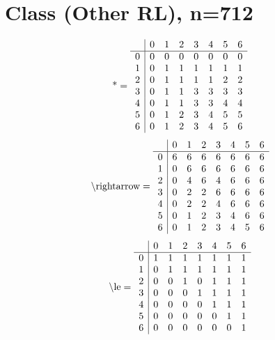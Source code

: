 \documentclass[11pt]{article}
\begin{document}
\section{Class (Other RL), n=712}
\[\text{*} = 
\begin{array}{r | r r r r r r r}
 & 0 & 1 & 2 & 3 & 4 & 5 & 6 \\ \hline
0 & 0 & 0 & 0 & 0 & 0 & 0 & 0 \\
1 & 0 & 1 & 1 & 1 & 1 & 1 & 1 \\
2 & 0 & 1 & 1 & 1 & 1 & 2 & 2 \\
3 & 0 & 1 & 1 & 3 & 3 & 3 & 3 \\
4 & 0 & 1 & 1 & 3 & 3 & 4 & 4 \\
5 & 0 & 1 & 2 & 3 & 4 & 5 & 5 \\
6 & 0 & 1 & 2 & 3 & 4 & 5 & 6 \\
\end{array}
\]
\[\text{\textbackslash rightarrow} = 
\begin{array}{r | r r r r r r r}
 & 0 & 1 & 2 & 3 & 4 & 5 & 6 \\ \hline
0 & 6 & 6 & 6 & 6 & 6 & 6 & 6 \\
1 & 0 & 6 & 6 & 6 & 6 & 6 & 6 \\
2 & 0 & 4 & 6 & 4 & 6 & 6 & 6 \\
3 & 0 & 2 & 2 & 6 & 6 & 6 & 6 \\
4 & 0 & 2 & 2 & 4 & 6 & 6 & 6 \\
5 & 0 & 1 & 2 & 3 & 4 & 6 & 6 \\
6 & 0 & 1 & 2 & 3 & 4 & 5 & 6 \\
\end{array}
\]
\[\text{\textbackslash le} = 
\begin{array}{r | r r r r r r r}
 & 0 & 1 & 2 & 3 & 4 & 5 & 6 \\ \hline
0 & 1 & 1 & 1 & 1 & 1 & 1 & 1 \\
1 & 0 & 1 & 1 & 1 & 1 & 1 & 1 \\
2 & 0 & 0 & 1 & 0 & 1 & 1 & 1 \\
3 & 0 & 0 & 0 & 1 & 1 & 1 & 1 \\
4 & 0 & 0 & 0 & 0 & 1 & 1 & 1 \\
5 & 0 & 0 & 0 & 0 & 0 & 1 & 1 \\
6 & 0 & 0 & 0 & 0 & 0 & 0 & 1 \\
\end{array}
\]
\end{document}
